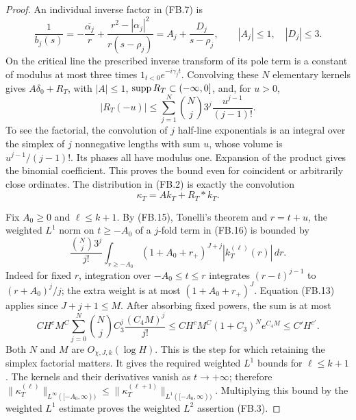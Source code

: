 \begin{proof}
An individual inverse factor in (FB.7) is
\[
 \frac1{b_j(s)}
      =-\frac{\overline{\alpha_j}}r+
          \frac{r^2-|\alpha_j|^2}{r(s-\rho_j)}
      =A_j+\frac{D_j}{s-\rho_j},
                    \qquad |A_j|\leq1,\quad |D_j|\leq3.
                                                               \tag{FB.14}
\]
On the critical line the prescribed inverse transform
of its pole term is a constant of modulus at most three
times $1_{t<0}e^{-i\gamma_jt}$.
Convolving these $N$ elementary kernels gives
$A\delta_0+R_T$, with $|A|\leq1$, $\operatorname{supp} R_T\subset(-\infty,0]$,
and, for $u>0$,
\[
 |R_T(-u)|\leq
       \sum_{j=1}^N {N\choose j}3^j
                              \frac{u^{j-1}}{(j-1)!}.         \tag{FB.15}
\]
To see the factorial, the convolution of $j$ half-line
exponentials is an integral over the simplex of
$j$ nonnegative lengths with sum $u$, whose volume is
$u^{j-1}/(j-1)!$.  Its phases all have modulus one.
Expansion of the product gives the binomial coefficient.
This proves the bound even for coincident or arbitrarily
close ordinates.
The distribution in (FB.2) is exactly the convolution
\[
                          \kappa_T=A k_T+R_T*k_T.             \tag{FB.16}
\]

Fix $A_0\geq0$ and $\ell\leq k+1$.
By (FB.15), Tonelli's theorem and $r=t+u$,
the weighted $L^1$ norm on $t\geq-A_0$ of a $j$-fold
term in (FB.16) is bounded by
\[
 \frac{{N\choose j}3^j}{j!}
     \int_{r\geq-A_0}(1+A_0+r_+)^{J+j}
                                   |k_T^{(\ell)}(r)|\,dr.
                                                               \tag{FB.17}
\]
Indeed for fixed $r$, integration over
$-A_0\leq t\leq r$ integrates
$(r-t)^{j-1}$ to $(r+A_0)^j/j$; the extra weight is
at most $(1+A_0+r_+)^J$.
Equation (FB.13) applies since $J+j+1\leq M$.
After absorbing fixed powers, the sum is at most
\[
 C H^c M^C
       \sum_{j=0}^N{N\choose j}
                        C_3^j\frac{(C_4M)^j}{j!}
 \leq C H^c M^C(1+C_3)^N e^{C_4M}
 \leq C'H^{c'}.                                      \tag{FB.18}
\]
Both $N$ and $M$ are $O_{\chi,J,k}(\log H)$.
This is the step for which retaining the simplex
factorial matters.
It gives the required weighted $L^1$ bounds for
$\ell\leq k+1$.
The kernels and their derivatives vanish as $t\to+\infty$;
therefore
$\|\kappa_T^{(\ell)}\|_{L^\infty([-A_0,\infty))}
\leq\|\kappa_T^{(\ell+1)}\|_{L^1([-A_0,\infty))}$.
Multiplying this bound by the weighted $L^1$ estimate
proves the weighted $L^2$ assertion (FB.3).


\end{proof}
